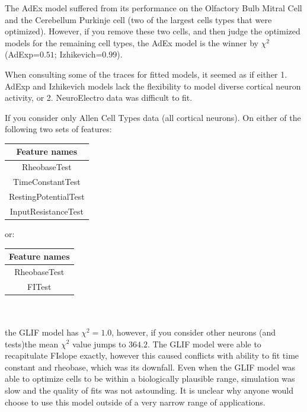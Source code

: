 The AdEx model suffered from its performance on the Olfactory Bulb Mitral Cell and the Cerebellum Purkinje cell (two of the largest cells types that were optimized). 
However, if you remove these two cells, and then judge the optimized models for the remaining cell types, the AdEx model is the winner by $\chi^{2}$ (AdExp=$0.51$; Izhikevich=$0.99$).

When consulting some of the traces for fitted models, it seemed as if either 1. AdExp and Izhikevich models lack the flexibility to model diverse cortical neuron activity, or 2. NeuroElectro data was difficult to fit.

% 

If you consider only Allen Cell Types data (all cortical neurons). On either of the following two sets of features:
\\

\begin{tabular}{|c|}
\toprule
Feature names \\
\midrule
RheobaseTest          \\
TimeConstantTest      \\
RestingPotentialTest  \\
InputResistanceTest   \\
\bottomrule
\end{tabular}
or:
\begin{tabular}{|c|}
\toprule
Feature names \\
\midrule
RheobaseTest \\
FITest      \\
\bottomrule
\end{tabular}
\\
\\
the GLIF model has $\chi^{2}=1.0$, however, if you consider other neurons (and tests)the mean $\chi^{2}$ value jumps to $364.2$.
The GLIF model were able to recapitulate FIslope exactly, however this caused conflicts with ability to fit time constant and rheobase, which was its downfall.
Even when the GLIF model was able to optimize cells to be within a biologically plausible range, simulation was slow and the quality of fits was not astounding.
It is unclear why anyone would choose to use this model outside of a very narrow range of applications.

